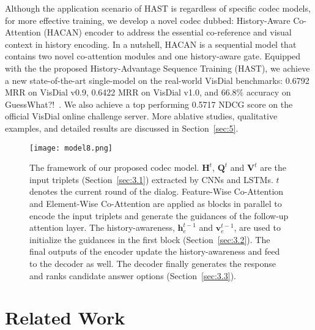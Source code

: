 \documentclass[10pt,twocolumn,letterpaper]{article}
\begin{document}
Although the application scenario of HAST is regardless of specific codec models, for more effective training, we develop a novel codec dubbed: History-Aware Co-Attention (HACAN) encoder to address the essential co-reference and visual context in history encoding. In a nutshell, HACAN is a sequential model that contains two novel co-attention modules and one history-aware gate. Equipped with the the proposed History-Advantage Sequence Training (HAST), we achieve a new state-of-the-art single-model on the real-world VisDial benchmarks: 0.6792 MRR on VisDial v0.9, 0.6422 MRR on  VisDial v1.0, and 66.8\% accuracy on GuessWhat?!~\cite{de2017guesswhat}. We also achieve a top performing 0.5717 NDCG score on the official VisDial online challenge server. More ablative studies, qualitative examples, and detailed results are discussed in Section~\ref{sec:5}.

\begin{figure*}[t]
\begin{center}
\texttt{[image: model8.png]}
\end{center}
    \caption{The framework of our proposed codec model. $\bm{H}^t$, $\bm{Q}^t$ and $\bm{V}^t$ are the input triplets (Section~\ref{sec:3.1}) extracted by CNNs and LSTMs. $t$ denotes the current round of the dialog. Feature-Wise Co-Attention and Element-Wise Co-Attention are applied as blocks in parallel to encode the input triplets and generate the guidances of the follow-up attention layer. The history-awareness, $\bm{h}_e^{t-1}$ and $\bm{v}_e^{t-1}$, are used to initialize the guidances in the first block (Section~\ref{sec:3.2}). The final outputs of the encoder update the history-awareness and feed to the decoder as well. The decoder finally generates the response and ranks candidate answer options (Section~\ref{sec:3.3}).
    }
\label{fig:model}
\end{figure*}


\section{Related Work}\label{sec 2}
\end{document}
